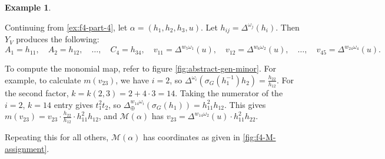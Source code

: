 \documentclass{amsart}
\theoremstyle{plain}
\theoremstyle{definition}
\newtheorem{example}[theorem]{Example}
\theoremstyle{remark}
\newcommand{\conftoquiv}{\mathcal{M}}
\newcommand{\fundamentalweight}{\omega}
\newcommand{\genminor}[2]{\Delta^{{#1} \fundamentalweight_{#2}}}
\newcommand{\genminornumerator}[2]{\Delta_{\oplus}^{{#1} {#2}}}
\newcommand{\minorcoordmap}{Y}
\newcommand{\monomialmap}{m}
\begin{document}
  \begin{example}
    \label{ex:f4-part-6}

    Continuing from \cref{ex:f4-part-4}, let $\alpha = (h_1, h_2, h_3,
    u)$. Let $h_{ij} = \genminor{}{j}(h_i)$. Then $\minorcoordmap_{V}$
    produces the following: \[ A_1 = h_{11}, \quad A_2 = h_{12}, \quad
      \dotsc, \quad C_4 = h_{34}, \quad v_{11} = \genminor{w_5}{1}(u),
      \quad v_{12} = \genminor{w_6}{2}(u), \quad \dotsc, \quad v_{45} =
      \genminor{w_{24}}{4}(u). \]

    To compute the monomial map, refer to figure
    \cref{fig:abstract-gen-minor}. For example, to calculate
    $\monomialmap(v_{23})$, we have $i = 2$, so
    $\genminor{}{i}(\sigma_G(h_1^{-1}) h_2) = \frac{h_{22}}{h_{12}}$.
    For the second factor, $k = k(2,3) = 2 + 4\cdot 3 = 14$. Taking the
    numerator of the $i = 2$, $k = 14$ entry gives $t_1^2 t_2$, so
    $\genminornumerator{w_{14}}{\fundamentalweight_i}(\sigma_G(h_1)) =
    h_{11}^2 h_{12}$. This gives $\monomialmap(v_{23}) = v_{23} \cdot
    \frac{h_{22}}{h_{12}} \cdot h_{11}^2 h_{12}$, and
    $\conftoquiv(\alpha)$ has $v_{23} = \genminor{w_{14}}{2}(u) \cdot
    h_{11}^2 h_{22}$.

    Repeating this for all others, $\conftoquiv(\alpha)$ has coordinates
    as given in \cref{fig:f4-M-assignment}.
  \end{example}
\end{document}
